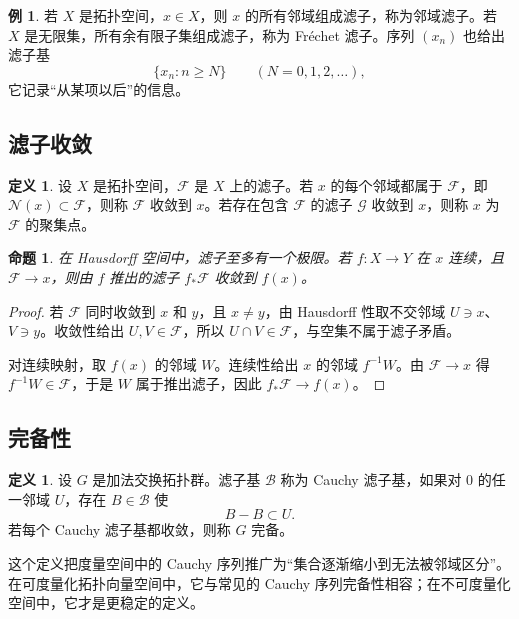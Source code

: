 \documentclass[11pt,a4paper,openany]{ctexbook}
\numberwithin{equation}{chapter}
\theoremstyle{plain}
\newtheorem{proposition}[theorem]{命题}
\theoremstyle{definition}
\newtheorem{definition}[theorem]{定义}
\newtheorem{example}[theorem]{例}
\theoremstyle{remark}
\begin{document}
\begin{example}
若 $X$ 是拓扑空间，$x\in X$，则 $x$ 的所有邻域组成滤子，称为邻域滤子。若 $X$ 是无限集，所有余有限子集组成滤子，称为 Fréchet 滤子。序列 $(x_n)$ 也给出滤子基
\[
  \{x_n:n\ge N\}\qquad (N=0,1,2,\ldots),
\]
它记录“从某项以后”的信息。
\end{example}

\subsection{滤子收敛}

\begin{definition}
设 $X$ 是拓扑空间，$\mathcal F$ 是 $X$ 上的滤子。若 $x$ 的每个邻域都属于 $\mathcal F$，即 $\mathcal N(x)\subset\mathcal F$，则称 $\mathcal F$ 收敛到 $x$。若存在包含 $\mathcal F$ 的滤子 $\mathcal G$ 收敛到 $x$，则称 $x$ 为 $\mathcal F$ 的聚集点。
\end{definition}

\begin{proposition}
在 Hausdorff 空间中，滤子至多有一个极限。若 $f:X\to Y$ 在 $x$ 连续，且 $\mathcal F\to x$，则由 $f$ 推出的滤子 $f_*\mathcal F$ 收敛到 $f(x)$。
\end{proposition}

\begin{proof}
若 $\mathcal F$ 同时收敛到 $x$ 和 $y$，且 $x\ne y$，由 Hausdorff 性取不交邻域 $U\ni x$、$V\ni y$。收敛性给出 $U,V\in\mathcal F$，所以 $U\cap V\in\mathcal F$，与空集不属于滤子矛盾。

对连续映射，取 $f(x)$ 的邻域 $W$。连续性给出 $x$ 的邻域 $f^{-1}W$。由 $\mathcal F\to x$ 得 $f^{-1}W\in\mathcal F$，于是 $W$ 属于推出滤子，因此 $f_*\mathcal F\to f(x)$。
\end{proof}

\subsection{完备性}

\begin{definition}
设 $G$ 是加法交换拓扑群。滤子基 $\mathcal B$ 称为 Cauchy 滤子基，如果对 $0$ 的任一邻域 $U$，存在 $B\in\mathcal B$ 使
\[
  B-B\subset U.
\]
若每个 Cauchy 滤子基都收敛，则称 $G$ 完备。
\end{definition}

这个定义把度量空间中的 Cauchy 序列推广为“集合逐渐缩小到无法被邻域区分”。在可度量化拓扑向量空间中，它与常见的 Cauchy 序列完备性相容；在不可度量化空间中，它才是更稳定的定义。
\end{document}
